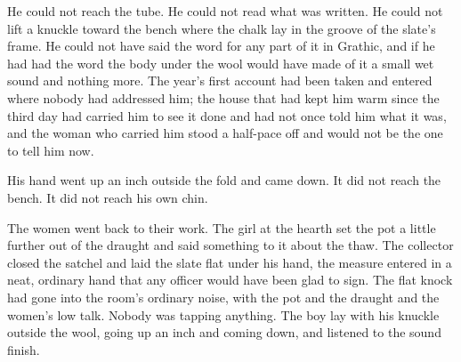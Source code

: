 He could not reach the tube. He could not read what was written. He could not lift a knuckle toward the bench where the chalk lay in the groove of the slate's frame. He could not have said the word for any part of it in Grathic, and if he had had the word the body under the wool would have made of it a small wet sound and nothing more. The year's first account had been taken and entered where nobody had addressed him; the house that had kept him warm since the third day had carried him to see it done and had not once told him what it was, and the woman who carried him stood a half-pace off and would not be the one to tell him now.

His hand went up an inch outside the fold and came down. It did not reach the bench. It did not reach his own chin.

The women went back to their work. The girl at the hearth set the pot a little further out of the draught and said something to it about the thaw. The collector closed the satchel and laid the slate flat under his hand, the measure entered in a neat, ordinary hand that any officer would have been glad to sign. The flat knock had gone into the room's ordinary noise, with the pot and the draught and the women's low talk. Nobody was tapping anything. The boy lay with his knuckle outside the wool, going up an inch and coming down, and listened to the sound finish.

